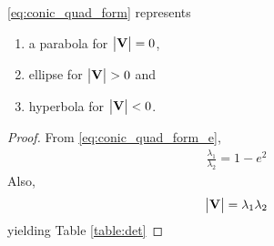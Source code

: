 \documentclass[journal,12pt,onecolumn]{IEEEtran}
\begin{document}
\begin{theorem}
\eqref{eq:conic_quad_form} represents 
	\begin{enumerate}
		\item a parabola for $\begin{vmatrix}\mathbf{V}\end{vmatrix} = 0 $,
		\item ellipse for $\begin{vmatrix}\mathbf{V}\end{vmatrix} > 0 $ and 
		\item hyperbola for $\begin{vmatrix}\mathbf{V}\end{vmatrix} < 0 $.
	\end{enumerate}
\end{theorem}
\begin{proof}
  From \eqref{eq:conic_quad_form_e},
\begin{align}
  \frac{\lambda_1}{\lambda_2} = 1 - e^2
\end{align}
Also, 
\begin{align}
	\begin{vmatrix}\mathbf{V}\end{vmatrix} =   \lambda_1\lambda_2 
\end{align}
	yielding Table \ref{table:det}
\begin{table}[!h]
\centering

	\caption{}
\label{table:det}
\end{table}
\end{proof}
\end{document}
